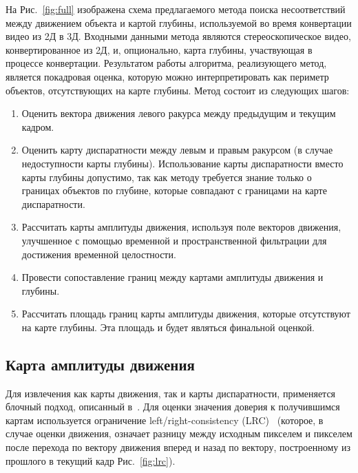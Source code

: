 \documentclass[14pt, a4paper]{extarticle}
\begin{document}
На Рис.~\ref{fig:full} изображена схема предлагаемого метода поиска несоответствий между
движением объекта и картой глубины, используемой во время конвертации видео из 2Д в 3Д.
Входными данными метода являются стереоскопическое видео, конвертированное из 2Д, и,
опционально, карта глубины, участвующая в процессе конвертации. Результатом работы
алгоритма, реализующего метод, является покадровая оценка, которую можно интерпретировать 
как периметр объектов, отсутствующих на карте глубины. Метод состоит из следующих шагов:

\begin{enumerate}
	\item Оценить вектора движения левого ракурса между предыдущим и текущим кадром.
	\item Оценить карту диспаратности между левым и правым ракурсом (в случае недоступности карты глубины).
	Использование карты диспаратности вместо карты глубины допустимо, так как методу требуется
	знание только о границах объектов по глубине, которые совпадают с границами на карте диспаратности.
	\item Рассчитать карты амплитуды движения, используя поле векторов движения, улучшенное
	с помощью временной и пространственной фильтрации для достижения временной целостности.
	\item Провести сопоставление границ между картами амплитуды движения и глубины.
	\item Рассчитать площадь границ карты амплитуды движения, которые отсутствуют на карте глубины.
	Эта площадь и будет являться финальной оценкой.
\end{enumerate}

\subsection{Карта амплитуды движения}



Для извлечения как карты движения, так и карты диспаратности, применяется блочный подход,
описанный в~\cite{simonyan2008fast}. Для оценки значения доверия к получившимся картам используется
ограничение left\slash right-consistency (LRC)~\cite{egnal2004stereo} (которое, в случае оценки движения,
означает разницу между исходным пикселем и пикселем после перехода по вектору движения 
вперед и назад по вектору, построенному из прошлого в текущий кадр Рис.~\ref{fig:lrc}).



\end{document}
